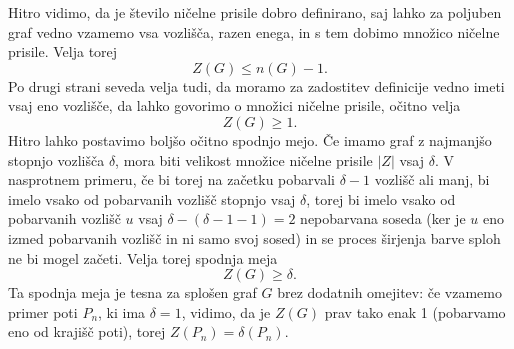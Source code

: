 \documentclass[12pt,a4paper,twoside]{article}
\theoremstyle{definition} %
\theoremstyle{plain} %
\numberwithin{equation}{section}  %
\begin{document}
Hitro vidimo, da je število ničelne prisile dobro definirano, saj lahko za poljuben graf vedno vzamemo vsa vozlišča, razen enega, in s tem dobimo množico ničelne prisile. Velja torej
\begin{equation}
    Z(G) \leq n(G) - 1.
    \label{eq:trv-zgornja-meja}
\end{equation}
Po drugi strani seveda velja tudi, da moramo za zadostitev definicije vedno imeti vsaj eno vozlišče, da lahko govorimo o množici ničelne prisile, očitno velja
\begin{equation}
Z(G)  \geq 1.
\label{eq:trv-trv-spodnja-meja}
\end{equation}
Hitro lahko postavimo boljšo očitno spodnjo mejo. Če imamo graf z najmanjšo stopnjo vozlišča $\delta$, mora biti velikost množice ničelne prisile $|Z|$ vsaj $\delta$. V nasprotnem primeru, če bi torej na začetku pobarvali $\delta - 1$ vozlišč ali manj, bi imelo vsako od pobarvanih vozlišč stopnjo vsaj $\delta$, torej bi imelo vsako od pobarvanih vozlišč $u$ vsaj $\delta - (\delta - 1 - 1) = 2$ nepobarvana soseda (ker je $u$ eno izmed pobarvanih vozlišč in ni samo svoj sosed) in se proces širjenja barve sploh ne bi mogel začeti. Velja torej spodnja meja
\begin{equation}
    Z(G) \geq \delta.
    \label{eq:trv-spodnja-meja}
\end{equation}
Ta spodnja meja je tesna za splošen graf $G$ brez dodatnih omejitev: če vzamemo primer poti $P_n$, ki ima $\delta = 1$, vidimo, da je $Z(G)$ prav tako enak 1 (pobarvamo eno od krajišč poti), torej $Z(P_n) = \delta(P_n).$
\end{document}
